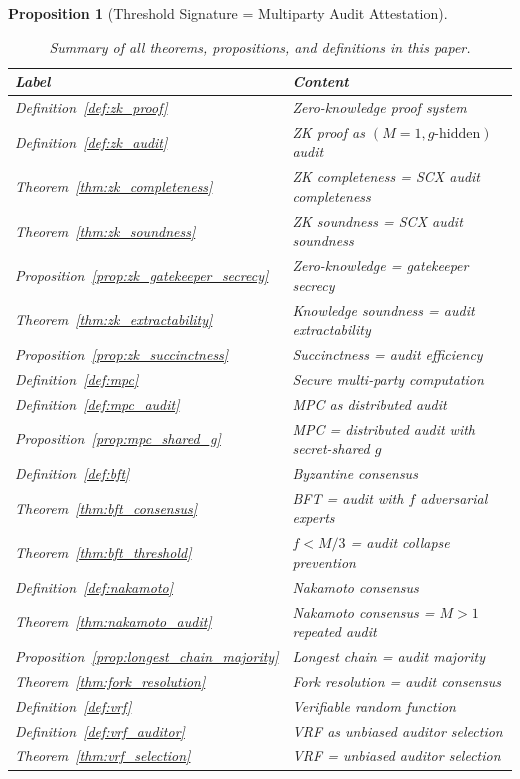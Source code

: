\documentclass[12pt,a4paper]{article}
\newtheorem{proposition}[theorem]{Proposition}
\theoremstyle{remark}
\begin{document}
\begin{proposition}[Threshold Signature = Multiparty Audit Attestation]
\begin{table}[H]
\centering
\caption{Summary of all theorems, propositions, and definitions in this paper.}
\label{tab:summary}
\begin{tabular}{@{}ll@{}}
\toprule
\textbf{Label} & \textbf{Content} \\
\midrule
Definition~\ref{def:zk_proof} & Zero-knowledge proof system \\
Definition~\ref{def:zk_audit} & ZK proof as $(M=1, g\text{-hidden})$ audit \\
Theorem~\ref{thm:zk_completeness} & ZK completeness = SCX audit completeness \\
Theorem~\ref{thm:zk_soundness} & ZK soundness = SCX audit soundness \\
Proposition~\ref{prop:zk_gatekeeper_secrecy} & Zero-knowledge = gatekeeper secrecy \\
Theorem~\ref{thm:zk_extractability} & Knowledge soundness = audit extractability \\
Proposition~\ref{prop:zk_succinctness} & Succinctness = audit efficiency \\
\midrule
Definition~\ref{def:mpc} & Secure multi-party computation \\
Definition~\ref{def:mpc_audit} & MPC as distributed audit \\
Proposition~\ref{prop:mpc_shared_g} & MPC = distributed audit with secret-shared $g$ \\
\midrule
Definition~\ref{def:bft} & Byzantine consensus \\
Theorem~\ref{thm:bft_consensus} & BFT = audit with $f$ adversarial experts \\
Theorem~\ref{thm:bft_threshold} & $f < M/3$ = audit collapse prevention \\
\midrule
Definition~\ref{def:nakamoto} & Nakamoto consensus \\
Theorem~\ref{thm:nakamoto_audit} & Nakamoto consensus = $M>1$ repeated audit \\
Proposition~\ref{prop:longest_chain_majority} & Longest chain = audit majority \\
Theorem~\ref{thm:fork_resolution} & Fork resolution = audit consensus \\
\midrule
Definition~\ref{def:vrf} & Verifiable random function \\
Definition~\ref{def:vrf_auditor} & VRF as unbiased auditor selection \\
Theorem~\ref{thm:vrf_selection} & VRF = unbiased auditor selection \\

\end{tabular}
\end{table}
\end{proposition}
\end{document}
